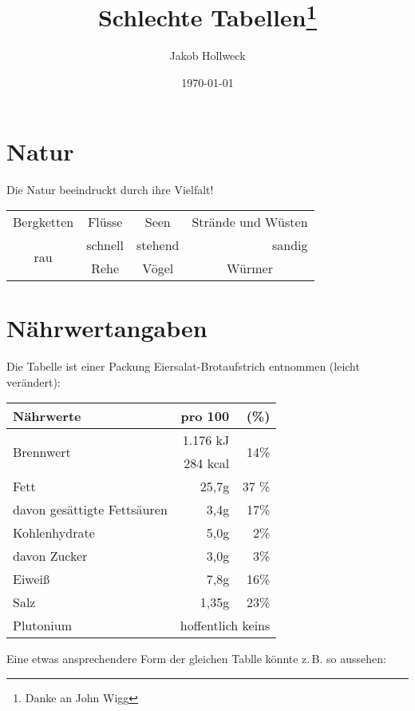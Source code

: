 \documentclass[a4paper, 10pt,onecolumn]{scrartcl}
\title{Schlechte Tabellen\thanks{Danke an John Wigg}}
\author{Jakob Hollweck} %
\date{\today}
\begin{document}
\tableofcontents
\maketitle

\section{Natur}
Die Natur beeindruckt durch ihre Vielfalt!\\

\begin{center}
	\begin{tabular}{|c|c|c|c|}
		\hline
		Bergketten & Flüsse & Seen & Strände und Wüsten\\
		\cline{1-3}
		\multirow{2}{*}{rau}   &  schnell & stehend & \multicolumn{1}{|r|}{sandig}       \\
		\cline{2-4}
		& Rehe & Vögel & Würmer\\
		\hline
	\end{tabular}
\end{center}

\section{Nährwertangaben}
Die Tabelle ist einer Packung Eiersalat-Brotaufstrich entnommen (leicht verändert):

\begin{center}
\begin{tabular}{|l|r|r|}
	\hline
	\textbf{Nährwerte} & \textbf{pro 100} & \textbf{(\%)}\footnotemark[1]\\
	\hline
	\multirow{2}{*}{Brennwert} & 1.176 kJ & \multirow{2}{*}{14\%} \\
	& 284 kcal & \\
	\hline 
	Fett & 25,7g & 37 \% \\
	davon gesättigte Fettsäuren & 3,4g & 17\% \\
	\hline
	Kohlenhydrate & 5,0g & 2\% \\
	davon Zucker & 3,0g & 3\% \\
	\hline
	Eiweiß & 7,8g & 16\% \\
	\hline
	Salz & 1,35g & 23\%\\ \hline
	Plutonium & \multicolumn{2}{c|}{hoffentlich keins}\\
	\hline

\end{tabular}
\end{center}
\newpage
Eine etwas ansprechendere Form der gleichen Tablle könnte z.\,B. so aussehen:
\end{document}
